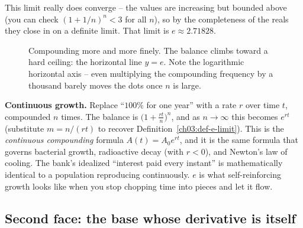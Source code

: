 This limit really does converge -- the values are increasing but bounded above (you can check $(1+1/n)^n < 3$ for all $n$), so by the completeness of the reals they close in on a definite limit. That limit is $e \approx 2.71828$.

\begin{figure}[H]
\centering
{}
\caption{Compounding more and more finely. The balance climbs toward a hard ceiling: the horizontal line $y=e$. Note the logarithmic horizontal axis -- even multiplying the compounding frequency by a thousand barely moves the dots once $n$ is large.}
\label{ch03:fig-compound}
\end{figure}

\begin{applicationbox}
\textbf{Continuous growth.} Replace ``$100\%$ for one year'' with a rate $r$ over time $t$, compounded $n$ times. The balance is $\big(1+\tfrac{rt}{n}\big)^{n}$, and as $n\to\infty$ this becomes $e^{rt}$ (substitute $m=n/(rt)$ to recover Definition~\ref{ch03:def-e-limit}). This is the \emph{continuous compounding} formula $A(t)=A_0 e^{rt}$, and it is the same formula that governs bacterial growth, radioactive decay (with $r<0$), and Newton's law of cooling. The bank's idealized ``interest paid every instant'' is mathematically identical to a population reproducing continuously. $e$ is what self-reinforcing growth looks like when you stop chopping time into pieces and let it flow.
\end{applicationbox}

\subsection{Second face: the base whose derivative is itself}

